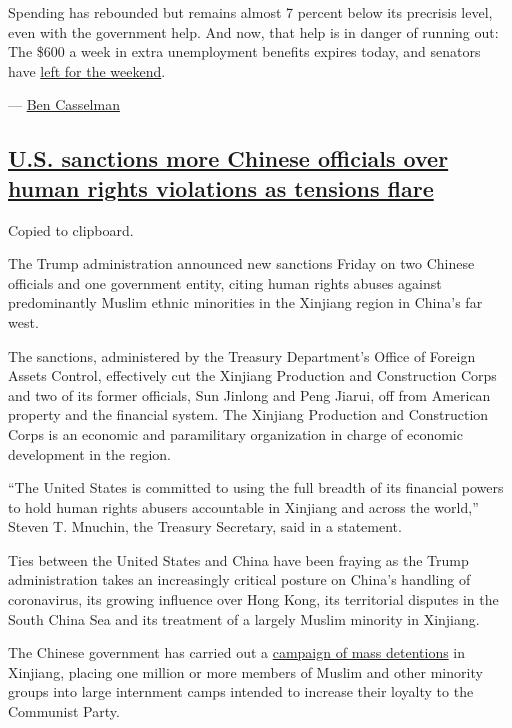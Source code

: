 Spending has rebounded but remains almost 7 percent below its precrisis
level, even with the government help. And now, that help is in danger of
running out: The \$600 a week in extra unemployment benefits expires
today, and senators have
\href{https://www.nytimes.com/2020/07/30/us/politics/senate-virus-aid.html}{left
for the weekend}.

--- \href{https://www.nytimes.com/by/ben-casselman}{Ben Casselman}

\hypertarget{us-sanctions-more-chinese-officials-over-human-rights-violations-as-tensions-flare}{%
\subsection{\texorpdfstring{\protect\hyperlink{us-sanctions-more-chinese-officials-over-human-rights-violations-as-tensions-flare}{U.S.
sanctions more Chinese officials over human rights violations as
tensions
flare}}{U.S. sanctions more Chinese officials over human rights violations as tensions flare}}\label{us-sanctions-more-chinese-officials-over-human-rights-violations-as-tensions-flare}}

Copied to clipboard.

The Trump administration announced new sanctions Friday on two Chinese
officials and one government entity, citing human rights abuses against
predominantly Muslim ethnic minorities in the Xinjiang region in China's
far west.

The sanctions, administered by the Treasury Department's Office of
Foreign Assets Control, effectively cut the Xinjiang Production and
Construction Corps and two of its former officials, Sun Jinlong and Peng
Jiarui, off from American property and the financial system. The
Xinjiang Production and Construction Corps is an economic and
paramilitary organization in charge of economic development in the
region.

``The United States is committed to using the full breadth of its
financial powers to hold human rights abusers accountable in Xinjiang
and across the world,'' Steven T. Mnuchin, the Treasury Secretary, said
in a statement.

Ties between the United States and China have been fraying as the Trump
administration takes an increasingly critical posture on China's
handling of coronavirus, its growing influence over Hong Kong, its
territorial disputes in the South China Sea and its treatment of a
largely Muslim minority in Xinjiang.

The Chinese government has carried out a
\href{https://www.nytimes.com/interactive/2019/11/16/world/asia/china-xinjiang-documents.html}{campaign
of mass detentions} in Xinjiang, placing one million or more members of
Muslim and other minority groups into large internment camps intended to
increase their loyalty to the Communist Party.

